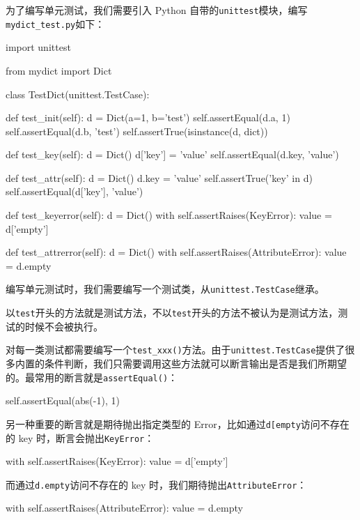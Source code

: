 为了编写单元测试，我们需要引入 Python
自带的\texttt{unittest}模块，编写\texttt{mydict\_test.py}如下：

\begin{pythoncode}
import unittest

from mydict import Dict

class TestDict(unittest.TestCase):

    def test_init(self):
        d = Dict(a=1, b='test')
        self.assertEqual(d.a, 1)
        self.assertEqual(d.b, 'test')
        self.assertTrue(isinstance(d, dict))

    def test_key(self):
        d = Dict()
        d['key'] = 'value'
        self.assertEqual(d.key, 'value')

    def test_attr(self):
        d = Dict()
        d.key = 'value'
        self.assertTrue('key' in d)
        self.assertEqual(d['key'], 'value')

    def test_keyerror(self):
        d = Dict()
        with self.assertRaises(KeyError):
            value = d['empty']

    def test_attrerror(self):
        d = Dict()
        with self.assertRaises(AttributeError):
            value = d.empty
\end{pythoncode}

编写单元测试时，我们需要编写一个测试类，从\texttt{unittest.TestCase}继承。

以\texttt{test}开头的方法就是测试方法，不以\texttt{test}开头的方法不被认为是测试方法，测试的时候不会被执行。

对每一类测试都需要编写一个\texttt{test\_xxx()}方法。由于\texttt{unittest.TestCase}提供了很多内置的条件判断，我们只需要调用这些方法就可以断言输出是否是我们所期望的。最常用的断言就是\texttt{assertEqual()}：

\begin{pythoncode}
self.assertEqual(abs(-1), 1) 
\end{pythoncode}

另一种重要的断言就是期待抛出指定类型的
Error，比如通过\texttt{d{[}\textquotesingle{}empty\textquotesingle{}{]}}访问不存在的
key 时，断言会抛出\texttt{KeyError}：

\begin{pythoncode}
with self.assertRaises(KeyError):
    value = d['empty']
\end{pythoncode}

而通过\texttt{d.empty}访问不存在的 key
时，我们期待抛出\texttt{AttributeError}：

\begin{pythoncode}
with self.assertRaises(AttributeError):
    value = d.empty
\end{pythoncode}

